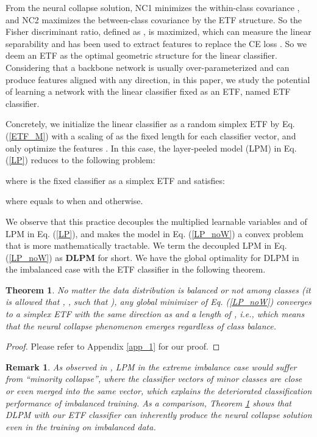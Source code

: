 \documentclass{article}
\newtheorem{theorem}{Theorem}
\newtheorem{remark}{Remark}
\newtheorem{proof}{Proof}
\newcommand{\<}{\left\langle}
\renewcommand{\>}{\right\rangle}
\begin{document}
From the neural collapse solution, NC1 minimizes the within-class covariance , and NC2 maximizes the between-class covariance  by the ETF structure. So the Fisher discriminant ratio, defined as , is maximized, which can measure the linear separability and has been used to extract features to replace the CE loss \cite{stuhlsatz2012feature}. So we deem an ETF as the optimal geometric structure for the linear classifier. Considering that a backbone network is usually over-parameterized and can produce features aligned with any direction, in this paper, we study the potential of learning a network with the linear classifier fixed as an ETF, named ETF classifier. 

Concretely, we initialize the linear classifier  as a random simplex ETF by Eq. (\ref{ETF_M}) with a scaling of  as the fixed length for each classifier vector, and only optimize the features . In this case, the layer-peeled model (LPM) in Eq. (\ref{LP}) reduces to the following problem:

where  is the fixed classifier as a simplex ETF and satisfies:

where  equals to  when  and  otherwise. 

We observe that this practice decouples the multiplied learnable variables  and  of LPM in Eq. (\ref{LP}), and makes the model in Eq. (\ref{LP_noW}) a convex problem that is more mathematically tractable. We term the decoupled LPM in Eq. (\ref{LP_noW}) as \textbf{DLPM} for short. We have the global optimality for DLPM in the imbalanced case with the ETF classifier in the following theorem. 
\begin{theorem}
	\label{ETF_classifier}
	No matter the data distribution is balanced or not among classes (it is allowed that , , such that ), any global minimizer  of Eq. (\ref{LP_noW}) converges to a simplex ETF with the same direction as  and a length of , \emph{i.e.,}
which means that the neural collapse phenomenon emerges regardless of class balance. 
\end{theorem}
\begin{proof} 
	Please refer to Appendix \ref{app_1} for our proof.   
\end{proof}

\begin{remark}
	\label{remark1}
{As observed in \cite{fang2021exploring}, LPM in the extreme imbalance case would suffer from ``\emph{minority collapse}'', where the classifier vectors of minor classes are close or even merged into the same vector, which explains the deteriorated classification performance of imbalanced training. As a comparison, Theorem \ref{ETF_classifier} shows that DLPM with our ETF classifier can inherently produce the neural collapse solution even in the training on imbalanced data. }
\end{remark}
\end{document}
